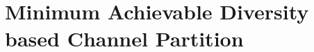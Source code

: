 \documentclass[12pt, draftclsnofoot, onecolumn]{IEEEtran}
\begin{document}
%



\section{Minimum Achievable Diversity based Channel Partition}
\end{document}
